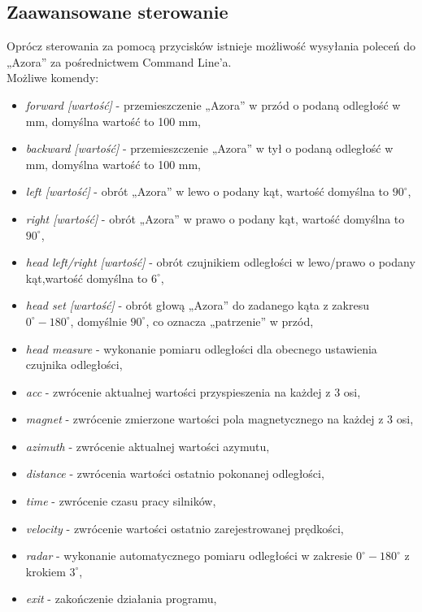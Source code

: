     \subsection{Zaawansowane sterowanie}
        \tab Oprócz sterowania za pomocą przycisków istnieje możliwość wysyłania poleceń do „Azora” za pośrednictwem Command Line'a.\\
        Możliwe komendy:
        \begin{itemize}
            \item \textit{forward [wartość]}            - przemieszczenie „Azora” w przód o podaną odległość w mm, domyślna wartość to 100 mm,
            \item \textit{backward [wartość]}           - przemieszczenie „Azora” w tył o podaną odległość w mm, domyślna wartość to 100 mm,
            \item \textit{left [wartość]}               - obrót „Azora” w lewo o podany kąt, wartość domyślna to $90^\circ$,
            \item \textit{right [wartość]}              - obrót „Azora” w prawo o podany kąt, wartość domyślna to $90^\circ$,
            \item \textit{head left/right [wartość]}    - obrót czujnikiem odległości w lewo/prawo o podany kąt,wartość domyślna to $6^\circ$,
            \item \textit{head set [wartość]}           - obrót głową „Azora” do zadanego kąta z zakresu $0^\circ-180^\circ$, domyślnie $90^\circ$, co oznacza „patrzenie” w przód,
            \item \textit{head measure}                 - wykonanie pomiaru odległości dla obecnego ustawienia czujnika odległości,
            \item \textit{acc}                          - zwrócenie aktualnej wartości przyspieszenia na każdej z 3 osi,
            \item \textit{magnet}                       - zwrócenie zmierzone wartości pola magnetycznego na każdej z 3 osi,
            \item \textit{azimuth}                      - zwrócenie aktualnej wartości azymutu,
            \item \textit{distance}                     - zwrócenia wartości ostatnio pokonanej odległości,
            \item \textit{time}                         - zwrócenie czasu pracy silników,
            \item \textit{velocity}                     - zwrócenie wartości ostatnio zarejestrowanej prędkości,
            \item \textit{radar}                        - wykonanie automatycznego pomiaru odległości w zakresie $0^\circ-180^\circ$ z krokiem $3^\circ$,
            \item \textit{exit}                         - zakończenie działania programu,
        \end{itemize}
    